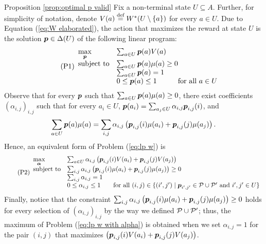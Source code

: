 \begin{proofof}{Proposition \ref{prop:optimal p valid}}
Fix a non-terminal state $U\subseteq A$. Further, for simplicity of notation, denote $V(a)\stackrel{\text{def}}{=} W^*(U\setminus \{a\})$ for every $a\in U$. Due to Equation (\ref{eq:W elaborated}), the action that maximizes the reward at state $U$ is the solution $\boldsymbol{ p } \in \Delta(U)$ of the following linear program:
\begin{equation}
\tag{P1} \label{eq:lp w}
\begin{array}{ll@{}ll}
\max \limits_{\bl p} &\sum_{a\in U} \bl p(a)V(a)   & \\
\text{subject to} & \sum_{a\in U} \bl p(a)\mu(a) \geq 0 &     \\
& \sum_{a\in U} \bl p(a)=1 &  \\
& 0\leq \bl p(a) \leq 1 & \textnormal{for all }a\in U
\end{array}
\end{equation}
Observe that for every $\boldsymbol{ p }$ such that $ \sum_{a\in U} \boldsymbol{ p }(a)\mu(a) \geq 0$, there exist coefficients $(\alpha_{i,j})_{i,j}$ such that for every $a_i\in U$, $\boldsymbol{ p }(a_i)=\sum_{a_j\in U}\alpha_{i,j}\boldsymbol{ p }_{i,j}(i)$, and
\[
\sum_{a\in U} \boldsymbol{ p }(a)\mu(a) = \sum_{i,j}\alpha_{i,j}\left(\boldsymbol{ p }_{i,j}(i)\mu(a_i)+\boldsymbol{ p }_{i,j}(j)\mu(a_j)\right).
\]
Hence, an equivalent form of Problem (\ref{eq:lp w}) is
\begin{equation}
\tag{P2} \label{eq:lp w with alpha}
\begin{array}{ll@{}ll}
\max \limits_{\bl \alpha} &\sum_{a\in U} \alpha_{i,j}\left(\bl p_{i,j}(i)V(a_i)+\bl p_{i,j}(j)V(a_j)\right)  & \\
\text{subject to} & \sum_{i,j}\alpha_{i,j}\left(\bl p_{i,j}(i)\mu(a_i)+\bl p_{i,j}(j)\mu(a_j)\right) \geq 0 &     \\
&\sum_{i,j}\alpha_{i,j}=1 &  \\
& 0\leq \alpha_{i,j} \leq 1 \qquad  \textnormal{for all }(i,j)\in \{(i',j')\mid \bl p_{i',j'} \in \mP\cup \mP'\textnormal{ and } i',j' \in U \} &
\end{array}
\end{equation}
Finally, notice that the constraint $\sum_{i,j}\alpha_{i,j}\left(\boldsymbol{ p }_{i,j}(i)\mu(a_i)+\boldsymbol{ p }_{i,j}(j)\mu(a_j)\right) \geq 0$ holds for every selection of $(\alpha_{i,j})_{i,j}$ by the way we defined $\mathcal{P}\cup \mathcal{P}'$; thus, the maximum of Problem (\ref{eq:lp w with alpha}) is obtained when we set $\alpha_{i,j}=1$ for the pair $(i,j)$ that maximizes $\left(\boldsymbol{ p }_{i,j}(i)V(a_i)+\boldsymbol{ p }_{i,j}(j)V(a_j)\right) $.
\end{proofof}
